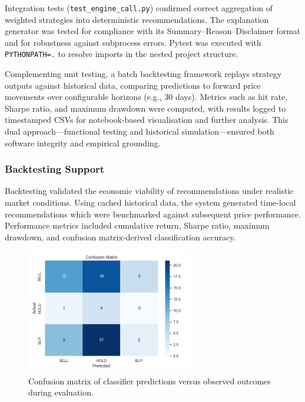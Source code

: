 Integration tests (\texttt{test\_engine\_call.py}) confirmed correct aggregation of weighted strategies into deterministic recommendations. The explanation generator was tested for compliance with its Summary–Reason–Disclaimer format and for robustness against subprocess errors. Pytest was executed with \texttt{PYTHONPATH=.} to resolve imports in the nested project structure.

Complementing unit testing, a batch backtesting framework replays strategy outputs against historical data, comparing predictions to forward price movements over configurable horizons (e.g., 30 days). Metrics such as hit rate, Sharpe ratio, and maximum drawdown were computed, with results logged to timestamped CSVs for notebook-based visualisation and further analysis. This dual approach—functional testing and historical simulation—ensured both software integrity and empirical grounding.

\subsubsection{Backtesting Support}

Backtesting validated the economic viability of recommendations under realistic market conditions. Using cached historical data, the system generated time-local recommendations which were benchmarked against subsequent price performance. Performance metrics included cumulative return, Sharpe ratio, maximum drawdown, and confusion matrix-derived classification accuracy.

\begin{figure}[ht]
    \centering
    \includegraphics[width=0.65\textwidth]{assets/confusion_matrix.png}
    \caption{\small Confusion matrix of classifier predictions versus observed outcomes during evaluation.}
    \label{fig:confusion-matrix}
\end{figure}

